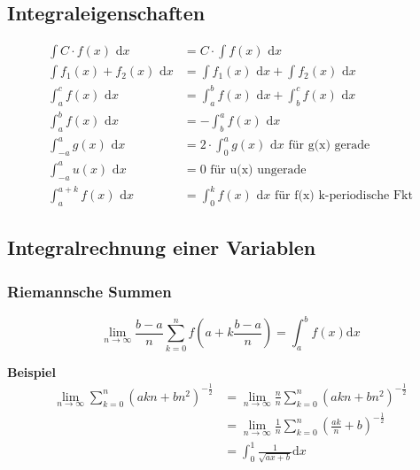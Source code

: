 \documentclass[8pt, a4paper, landscape, fleqn]{scrartcl}
\newenvironment {example}
				{\begin{itshape} \begin{small}}
				{\end{small} \end{itshape}}
\begin{document}
\begin{multicols*}{3}
		    \subsection{Integraleigenschaften}
		        \begin{align*}
		            \int C \cdot f(x) \text{ d}x &= C \cdot \int f(x) \text{ d}x\\
		            \int f_1(x) + f_2(x) \text{ d}x &= \int f_1(x) \text{ d}x + \int f_2(x)\text{ d}x\\
		            \int_a^c f(x) \text{ d}x &= \int_a^b f(x) \text{ d}x + \int_b^c f(x) \text{ d}x\\
		            \int_a^b f(x) \text{ d}x &= - \int_b^a f(x) \text{ d}x\\
		            \int_{-a}^a g(x) \text{ d}x &= 2 \cdot \int_0^a g(x) \text{ d}x \text{ für g(x) gerade}\\
		            \int_{-a}^a u(x) \text{ d}x &= 0 \text{ für u(x) ungerade}\\
		            \int_a^{a+k}f(x)\text{ d}x &= \int_0^kf(x) \text{ d}x \text{ für f(x) k-periodische Fkt}
		        \end{align*}
			\subsection{Integralrechnung einer Variablen}
				\subsubsection{Riemannsche Summen}
					\begin{equation*}
						\lim_{n \rightarrow \infty} \frac{b-a}{n} \sum_{k=0}^{n}f\left(a+k\frac{b-a}{n}\right)=\int_{a}^{b}f(x) \text{d}x
					\end{equation*}
					\begin{example}
						\textbf{Beispiel}
						\begin{align*}
						\lim_{n \rightarrow \infty} \sum_{k=0}^{n} \left(akn+bn^2\right)^{-\frac{1}{2}}&=\lim_{n \rightarrow \infty} \frac{n}{n} \sum_{k=0}^{n} \left(akn+bn^2\right)^{-\frac{1}{2}}\\
						&=\lim_{n \rightarrow \infty} \frac{1}{n} \sum_{k=0}^{n} \left(\frac{ak}{n}+b\right)^{-\frac{1}{2}}\\
						&=\int_{0}^{1}\frac{1}{\sqrt{ax+b}} \text{d}x
						\end{align*}
					\end{example}

\end{multicols*}
\end{document}

